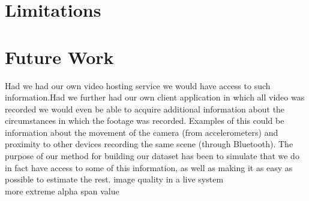 %
\section{Limitations}\label{sec:conc_lims}
%
\section{Future Work}\label{sec:futurework}
%
Had we had our own video hosting service we would have access to such information.Had we further had our own client application in which all video was recorded we would even be able to acquire additional information about the circumstances in which the footage was recorded. Examples of this could be information about the movement of the camera (from accelerometers) and proximity to other devices recording the same scene (through Bluetooth). The purpose of our method for building our dataset has been to simulate that we do in fact have access to some of this information, as well as making it as easy as possible to estimate the rest.
%
image quality in a live system\\
more extreme alpha span value